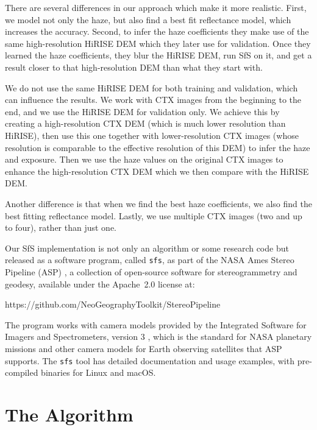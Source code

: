 \documentclass[draft,linenumbers]{agujournal}
\begin{document}
There are several differences in our approach which make it more realistic. First, we model not only the haze, but also find a best fit reflectance model, which increases the accuracy. Second, to infer the haze coefficients they make use of the same high-resolution HiRISE DEM which they later use for validation. Once they learned the haze coefficients, they blur the HiRISE DEM, run SfS on it, and get a result closer to that high-resolution DEM than what they start with. 

We do not use the same HiRISE DEM for both training and validation, which can influence the results. We work with CTX images from the beginning to the end, and we use the HiRISE DEM for validation only. We achieve this by creating a high-resolution CTX DEM (which is much lower resolution than HiRISE), then use this one together with lower-resolution CTX images (whose resolution is comparable to the effective resolution of this DEM) to infer the haze and exposure. Then we use the haze values on the original CTX images to enhance the high-resolution CTX DEM which we then compare with the HiRISE DEM.  

Another difference is that when we find the best haze coefficients, we also find the best fitting reflectance model. Lastly, we use multiple CTX images (two and up to four), rather than just one. 

Our SfS implementation is not only an algorithm or some research code but released as a software program, called \texttt{sfs}, as part
of the NASA Ames Stereo Pipeline (ASP) \citep{ASP2017}, a collection of
open-source software for stereogrammetry and geodesy, available
under the Apache~2.0 license at: \\

\begin{center}
https://github.com/NeoGeographyToolkit/StereoPipeline
\end{center}

The program works with camera models provided by the Integrated
Software for Imagers and Spectrometers, version 3 \citep[ISIS3,][]{2017LPI....48.2739S,ISIS_website},
which is the standard for NASA planetary missions and other camera models for Earth observing satellites that ASP supports. The \texttt{sfs} tool has detailed documentation
and usage examples, with pre-compiled binaries for Linux and macOS.

\section{The Algorithm}
\end{document}
